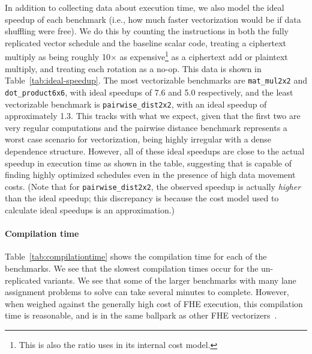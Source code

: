 In addition to collecting data about execution time, we also model the ideal speedup of each benchmark (i.e., how much faster vectorization would be if data shuffling were free).
We do this by counting the instructions in both the fully replicated vector schedule and the baseline scalar code, treating a ciphertext multiply as being roughly 10$\times$ as expensive\footnote{This is also the ratio \system uses in its internal cost model.} as a ciphertext add or plaintext multiply, and treating each rotation as a no-op.
This data is shown in Table~\ref{tab:ideal-speedup}.
The most vectorizable benchmarks are \texttt{mat\_mul2x2} and \texttt{dot\_product6x6}, with ideal speedups of 7.6 and 5.0 respectively, and the least vectorizable benchmark is \texttt{pairwise\_dist2x2}, with an ideal speedup of approximately 1.3.
This tracks with what we expect, given that the first two are very regular computations and the pairwise distance benchmark represents a worst case scenario for vectorization, being highly irregular with a dense dependence structure.
However, all of these ideal speedups are close to the actual speedup in execution time as shown in the table, suggesting that \system is capable of finding highly optimized schedules even in the presence of high data movement costs. (Note that for \texttt{pairwise\_dist2x2}, the observed speedup is actually {\em higher} than the ideal speedup; this discrepancy is because the cost model used to calculate ideal speedups is an approximation.)

\paragraph{Compilation time}
Table~\ref{tab:compilationtime} shows the compilation time for each of the benchmarks. We see that the slowest compilation times occur for the un-replicated variants. We see that some of the larger benchmarks with many lane assignment problems to solve can take several minutes to complete. However, when weighed against the generally high cost of FHE execution, this compilation time is reasonable, and is in the same ballpark as other FHE vectorizers~\cite{Porcupine}.

